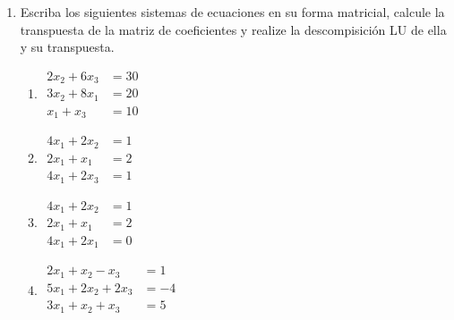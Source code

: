 \documentclass[11pt]{article}
\begin{document}
\begin{enumerate}
 \item Escriba los siguientes sistemas de ecuaciones en su forma matricial, calcule la transpuesta de la matriz de coeficientes y realize la descompisici\'on LU de ella y su transpuesta.
\begin{multicols}{2}
\begin{enumerate}
\item
$
\begin{array}{lr}
2x_2+6x_3	& = 30 \\
3x_2+8x_1	& = 20 \\
x_1+x_3		& = 10
\end{array}
$

\item 
$
\begin{array}{lr}
4x_1+2x_2	& = 1 \\
2x_1+x_1	& = 2 \\
4x_1+2x_3	& = 1
\end{array}
$

\item 
$
\begin{array}{lr}
4x_1+2x_2	& = 1 \\
2x_1+x_1	& = 2 \\
4x_1+2x_1	& = 0
\end{array}
$

\item 
$
\begin{array}{lr}
2x_1+x_2-x_3 	& = 1\\
5x_1+2x_2+2x_3	& =-4\\
3x_1+x_2+x_3	& =5\\
\end{array}
$
\end{enumerate}
\end{multicols}


\end{enumerate}
\end{document}
